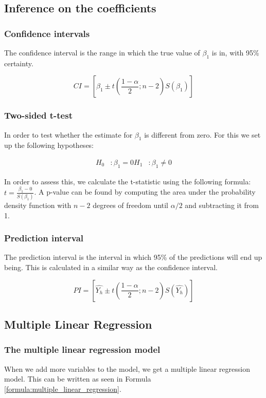 \subsection{Inference on the coefficients}
\subsubsection{Confidence intervals}

The confidence interval is the range in which the true value of $\beta_1$ is in, with 95\% certainty.

\begin{equation}
    CI = \left[\beta_1 \pm t(\frac{1 - \alpha}{2}; n-2) S(\beta_1) \right]
\end{equation}

\subsubsection{Two-sided t-test}
In order to test whether the estimate for $\beta_1$ is different from zero.
For this we set up the following hypotheses:

\begin{align}
    H_0&: \beta_1 = 0
    H_1&: \beta_1 \ne 0
\end{align}

In order to assess this, we calculate the t-statistic using the following formula: $t = \frac{\beta_1 - 0}{S(\beta_1)}$.
A p-value can be found by computing the area under the probability density function with $n-2$ degrees of freedom until $\alpha / 2$ and subtracting it from 1.

\subsubsection{Prediction interval}
The prediction interval is the interval in which 95\% of the predictions will end up being.
This is calculated in a similar way as the confidence interval.

\begin{equation}
    PI = \left[\hat{Y_h} \pm t(\frac{1 - \alpha}{2}; n-2) S(\hat{Y_h}) \right]
\end{equation}

\subsection{Multiple Linear Regression}
\subsubsection{The multiple linear regression model}
When we add more variables to the model, we get a multiple linear regression model.
This can be written as seen in Formula \ref{formula:multiple_linear_regression}.

